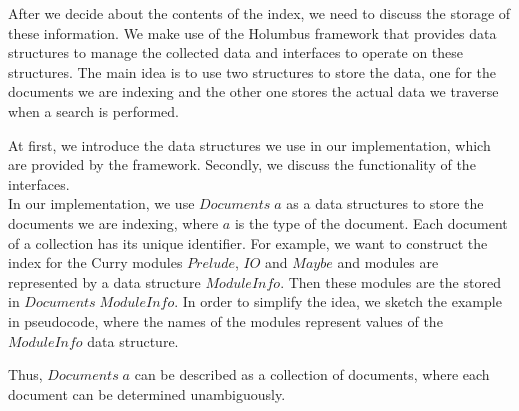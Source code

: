 \documentclass[%
	latex,%
	a4paper,%
	oneside,%
	chapterprefix,%
	headsepline,%
	12pt%
]{scrbook}
\newcommand{\Conid}[1]{\mathit{#1}}
\newcommand{\Varid}[1]{\mathit{#1}}
\def\resethooks{%
  \global\let\SaveRestoreHook\empty
  \global\let\ColumnHook\empty}
\let\hspre\empty
\let\hspost\empty
\begin{document}





After we decide about the contents of the index, we need to discuss
the storage of these information. %
We make use of the Holumbus framework that provides data structures to
manage the collected data and interfaces to operate on these
structures. %
The main idea is to use two structures to store the data, one for the
documents we are indexing and the other one stores the actual data we
traverse when a search is performed. %

At first, we introduce the data structures we use in our
implementation, which are provided by the framework. %
Secondly, we discuss the functionality of the interfaces. \\

In our implementation, we use \ensuremath{\Conid{Documents}\;\Varid{a}} as a data structures to
store the documents we are indexing, where \ensuremath{\Varid{a}} is the type of the
document. %
Each document of a collection has its unique identifier. %
For example, we want to construct the index for the Curry modules
\ensuremath{\Conid{Prelude}}, \ensuremath{\Conid{IO}} and \ensuremath{\Conid{Maybe}} and modules are represented
by a data structure \ensuremath{\Conid{ModuleInfo}}. %
Then these modules are the stored in \ensuremath{\Conid{Documents}\;\Conid{ModuleInfo}}. %
In order to simplify the idea, we sketch the example in pseudocode,
where the names of the modules represent values of the \ensuremath{\Conid{ModuleInfo}}
data structure. %

{\small
{}\resethooks
}
Thus, \ensuremath{\Conid{Documents}\;\Varid{a}} can be described as a collection of documents,
where each document can be determined unambiguously.
\end{document}
